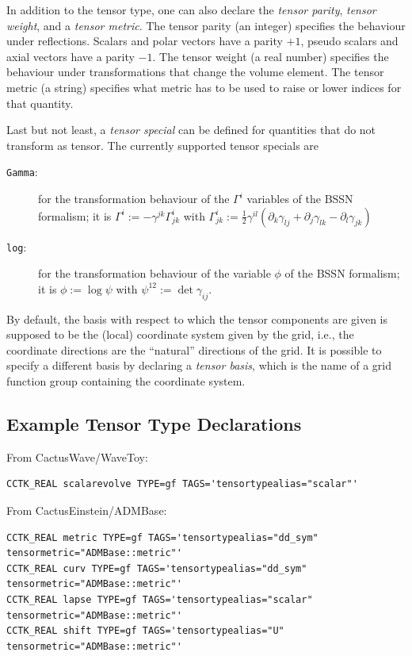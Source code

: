 In addition to the tensor type, one can also declare the \emph{tensor
  parity}, \emph{tensor weight}, and a \emph{tensor metric}.  The
tensor parity (an integer) specifies the behaviour under reflections.
Scalars and polar vectors have a parity $+1$, pseudo scalars and axial
vectors have a parity $-1$.  The tensor weight (a real number)
specifies the behaviour under transformations that change the volume
element.  The tensor metric (a string) specifies what metric has to be
used to raise or lower indices for that quantity.

Last but not least, a \emph{tensor special} can be defined for
quantities that do not transform as tensor.  The currently supported
tensor specials are
\begin{description}
\item[\texttt{Gamma}:]
   for the transformation behaviour of the $\Gamma^i$ variables of the
   BSSN formalism; it is $\Gamma^i := - \gamma^{jk} \Gamma^i_{jk}$
   with $\Gamma^i_{jk} := \frac{1}{2} \gamma^{il} \left( \partial_k
   \gamma_{lj} + \partial_j \gamma_{lk} - \partial_l \gamma_{jk}
   \right)$
\item[\texttt{log}:]
   for the transformation behaviour of the variable $\phi$ of the BSSN
   formalism; it is $\phi := \log \psi$ with $\psi^{12} := \det
   \gamma_{ij}$.
\end{description}

By default, the basis with respect to which the tensor components are
given is supposed to be the (local) coordinate system given by the
grid, i.e., the coordinate directions are the ``natural'' directions
of the grid.  It is possible to specify a different basis by declaring
a \emph{tensor basis}, which is the name of a grid function group
containing the coordinate system.

\subsection{Example Tensor Type Declarations}

From CactusWave/WaveToy:
\begin{verbatim}
CCTK_REAL scalarevolve TYPE=gf TAGS='tensortypealias="scalar"'
\end{verbatim}

From CactusEinstein/ADMBase:
\begin{verbatim}
CCTK_REAL metric TYPE=gf TAGS='tensortypealias="dd_sym" tensormetric="ADMBase::metric"'
CCTK_REAL curv TYPE=gf TAGS='tensortypealias="dd_sym" tensormetric="ADMBase::metric"'
CCTK_REAL lapse TYPE=gf TAGS='tensortypealias="scalar" tensormetric="ADMBase::metric"'
CCTK_REAL shift TYPE=gf TAGS='tensortypealias="U" tensormetric="ADMBase::metric"'
\end{verbatim}

